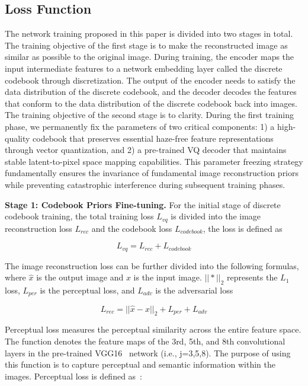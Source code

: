 \documentclass[journal]{IEEEtran}
\begin{document}
\subsection{Loss Function}

The network training proposed in this paper is divided into two stages in total. The training objective of the first stage is to make the reconstructed image as similar as possible to the original image. During training, the encoder maps the input intermediate features to a network embedding layer called the discrete codebook through discretization. The output of the encoder needs to satisfy the data distribution of the discrete codebook, and the decoder decodes the features that conform to the data distribution of the discrete codebook back into images. The training objective of the second stage is to clarity. During the first training phase, we permanently fix the parameters of two critical components: 1) a high-quality codebook that preserves essential haze-free feature representations through vector quantization, and 2) a pre-trained VQ decoder that maintains stable latent-to-pixel space mapping capabilities. This parameter freezing strategy fundamentally ensures the invariance of fundamental image reconstruction priors while preventing catastrophic interference during subsequent training phases.

	{\bf{Stage 1: Codebook Priors Fine-tuning.}} For the initial stage of discrete codebook training, the total training loss $L_{vq}$ is divided into the image reconstruction loss $L_{rec}$ and the codebook loss $L_{codebook}$, the loss is defined as

\begin{equation}
	\label{vq_loss}
	L_{vq} = L_{rec} + L_{codebook}
\end{equation}

The image reconstruction loss can be further divided into the following formulas, where $\hat{x}$ is the output image and $x$ is the input image. $|| * ||_{2}$ represents the $L_{1}$ loss, $L_{per}$ is the perceptual loss, and $L_{adv}$ is the adversarial loss

\begin{equation}
	\label{reconstruction_loss}
	L_{rec} = || \hat{x} - x ||_{2} + L_{per} + L_{adv}
\end{equation}

Perceptual loss measures the perceptual similarity across the entire feature space. The function denotes the feature maps of the 3rd, 5th, and 8th convolutional layers in the pre-trained VGG16~\cite{simonyan2014very} network (i.e., j=3,5,8). The purpose of using this function is to capture perceptual and semantic information within the images. Perceptual loss is defined as~\cite{johnson2016perceptual}:
\end{document}
